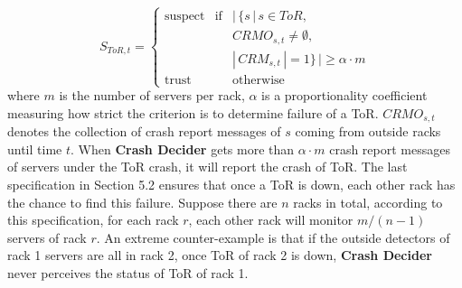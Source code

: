\documentclass{sig-alternate-05-2015}
\begin{document}
\begin{equation}
S_{ToR,t}=\left\{
    \begin{array}{lcl}
    \text{suspect} & \text{if} & |\, \{s\, |\, s \in ToR, \\
    && CRMO_{s,t} \not = \emptyset, \\
    && |\,CRM_{s,t}\,|=1\} \,| \geq \alpha \cdot m \\

    \text{trust} && \text{otherwise}
    \end{array}
\right.
\end{equation}
where $m$ is the number of servers per rack, $\alpha$ is a  proportionality coefficient measuring how strict the criterion is to determine failure of a ToR. $CRMO_{s,t}$ denotes the collection of crash report messages of $s$ coming from outside racks until time $t$. When \textbf{Crash Decider} gets more than $\alpha \cdot m$ crash report messages of servers under the ToR crash, it will report the crash of ToR. The last specification in Section 5.2 ensures that once a ToR is down, each other rack has the chance to find this failure. Suppose there are $n$ racks in total, according to this specification, for each rack $r$, each other rack will monitor $m/(n-1)$ servers of rack $r$. An extreme counter-example is that if the outside detectors of rack 1 servers are all in rack 2, once ToR of rack 2 is down, \textbf{Crash Decider} never perceives the status of ToR of rack 1.
\end{document}
